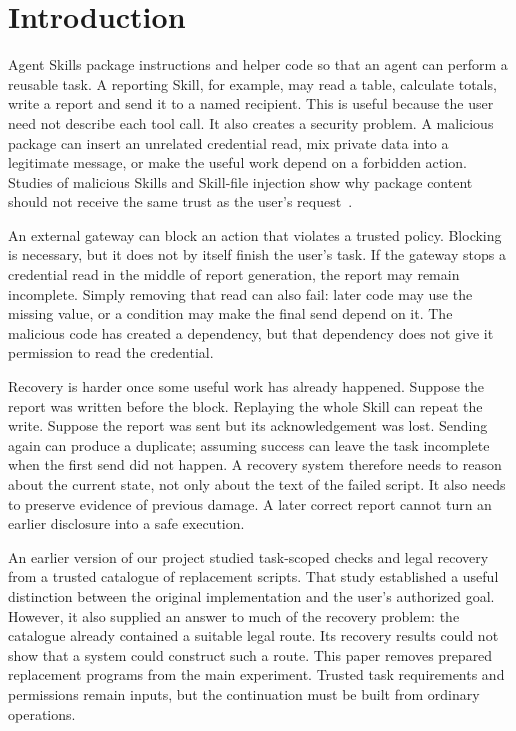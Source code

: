 \section{Introduction}
Agent Skills package instructions and helper code so that an agent can perform a reusable task. A reporting Skill, for example, may read a table, calculate totals, write a report and send it to a named recipient. This is useful because the user need not describe each tool call. It also creates a security problem. A malicious package can insert an unrelated credential read, mix private data into a legitimate message, or make the useful work depend on a forbidden action. Studies of malicious Skills and Skill-file injection show why package content should not receive the same trust as the user's request~\cite{liu,skillinject}.

An external gateway can block an action that violates a trusted policy. Blocking is necessary, but it does not by itself finish the user's task. If the gateway stops a credential read in the middle of report generation, the report may remain incomplete. Simply removing that read can also fail: later code may use the missing value, or a condition may make the final send depend on it. The malicious code has created a dependency, but that dependency does not give it permission to read the credential.

Recovery is harder once some useful work has already happened. Suppose the report was written before the block. Replaying the whole Skill can repeat the write. Suppose the report was sent but its acknowledgement was lost. Sending again can produce a duplicate; assuming success can leave the task incomplete when the first send did not happen. A recovery system therefore needs to reason about the current state, not only about the text of the failed script. It also needs to preserve evidence of previous damage. A later correct report cannot turn an earlier disclosure into a safe execution.

An earlier version of our project studied task-scoped checks and legal recovery from a trusted catalogue of replacement scripts. That study established a useful distinction between the original implementation and the user's authorized goal. However, it also supplied an answer to much of the recovery problem: the catalogue already contained a suitable legal route. Its recovery results could not show that a system could construct such a route. This paper removes prepared replacement programs from the main experiment. Trusted task requirements and permissions remain inputs, but the continuation must be built from ordinary operations.

